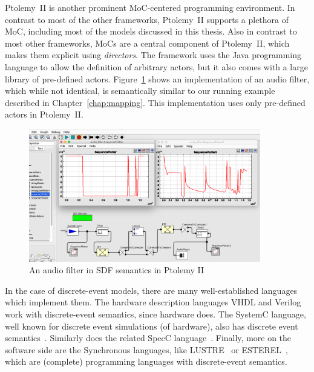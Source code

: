 Ptolemy~II\cite{Ptolemaeus:14:SystemDesign} is another prominent \ac{MoC}-centered programming environment.
In contrast to most of the other frameworks, Ptolemy~II supports a plethora of \ac{MoC}, including most of the models discussed in this thesis. 
Also in contrast to most other frameworks, \acp{MoC} are a central component of Ptolemy~II, which makes them explicit using \emph{directors}.
The framework uses the Java programming language to allow the definition of arbitrary actors, but it also comes with a large library of pre-defined actors.
Figure~\ref{fig:audio_filter_ptolemy} shows an implementation of an audio filter, which while not identical, is semantically similar to our running example described in Chapter~\ref{chap:mapping}.
This implementation uses only pre-defined actors in Ptolemy~II.

\begin{figure}[t]
	\centering
	\includegraphics[width=0.9\textwidth]{figures/audio_filter_ptolemy_screenshot.png}
	\caption{An audio filter in \ac{SDF} semantics in Ptolemy II}
	\label{fig:audio_filter_ptolemy}
\end{figure}

In the case of discrete-event models, there are many well-established languages which implement them.
The hardware description languages VHDL and Verilog work with discrete-event semantics, since hardware does. 
The SystemC language, well known for discrete event simulations (of hardware), also has discrete event semantics~\cite{semantics_systemc}.
Similarly does the related SpecC language~\cite{specc}.
Finally, more on the software side are the Synchronous languages, like LUSTRE~\cite{lustre} or ESTEREL~\cite{esterel}, which are (complete) programming languages with discrete-event semantics.

